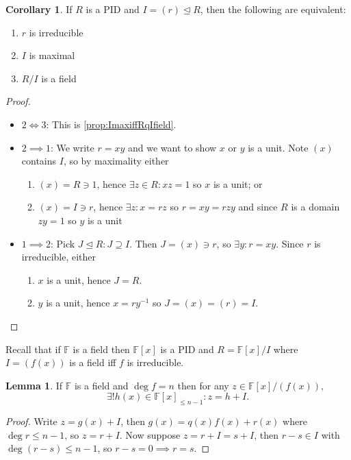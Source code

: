 \documentclass[a4paper]{article}
\newcommand{\F}{\mathbb{F}}
\theoremstyle{definition}
\newtheorem{lemma}[defn]{Lemma}
\newtheorem{coro}[defn]{Corollary}
\begin{document}
\begin{coro}
\label{coro:TFAErirredImaxRqIfield}
If $R$ is a PID and $I=(r)\unlhd R$, then the following are equivalent:
\begin{enumerate}
\item $r$ is irreducible
\item $I$ is maximal
\item $R/I$ is a field 
\end{enumerate}
\end{coro}
\begin{proof}
\begin{itemize}
\item $2\iff 3$: This is \ref{prop:ImaxiffRqIfield}.
\item $2\implies 1$: We write $r=xy$ and we want to show $x$ or $y$ is a unit. Note $(x)$ contains $I$, so by maximality either
\begin{enumerate}
\item $(x)=R\ni 1$, hence $\exists z\in R:xz=1$ so $x$ is a unit; or
\item $(x)=I\ni r$, hence $\exists z:x=rz$ so $r=xy=rzy$ and since $R$ is a domain $zy=1$ so $y$ is a unit
\end{enumerate}
\item $1\implies 2$: Pick $J\unlhd R:J\supseteq I$. Then $J=(x)\ni r$, so $\exists y:r=xy$. Since $r$ is irreducible, either
\begin{enumerate}
\item $x$ is a unit, hence $J=R$.
\item $y$ is a unit, hence $x=ry^{-1}$ so $J=(x)=(r)=I$.
\end{enumerate}
\end{itemize}
\end{proof}
Recall that if $\F$ is a field then $\F[x]$ is a PID and $R=\F[x]/I$ where $I=(f(x))$ is a field iff $f$ is irreducible.
\begin{lemma}
If $\F$ is a field and $\deg f=n$ then for any $z\in\F[x]/(f(x)),$
\[
\exists! h(x)\in\F[x]_{\leq n-1}:z=h+I.
\]
\end{lemma}
\begin{proof}
Write $z=g(x)+I$, then $g(x)=q(x)f(x)+r(x)$ where $\deg r\leq n-1$, so $z=r+I$. Now suppose $z=r+I=s+I$, then $r-s\in I$ with $\deg (r-s)\leq n-1$, so $r-s=0\implies r=s$.
\end{proof}
\end{document}
